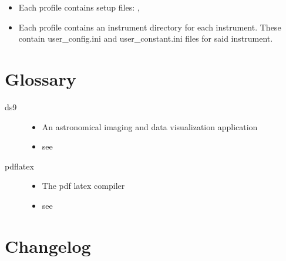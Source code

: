\documentclass[a4paper,10pt,english]{report}
\begin{document}
\begin{description}
\begin{itemize}
\item {} 
Each profile contains setup files: , 

\item {} 
Each profile contains an instrument directory for each instrument. These contain user\_config.ini and user\_constant.ini files for said instrument.

\end{itemize}

\end{description}


\section{Glossary}
\label{\detokenize{misc/glossary:glossary-main}}\label{\detokenize{misc/glossary:id1}}\begin{description}
\item[{ds9\label{\detokenize{misc/glossary:term-ds9}}}] \leavevmode\begin{itemize}
\item {} 
An astronomical imaging and data visualization application

\item {} 
see 

\end{itemize}

\item[{pdflatex\label{\detokenize{misc/glossary:term-pdflatex}}}] \leavevmode\begin{itemize}
\item {} 
The pdf latex compiler

\item {} 
see 

\end{itemize}

\end{description}


\section{Changelog}
\label{\detokenize{misc/changelog:changelog}}\label{\detokenize{misc/changelog::doc}}
\end{document}
